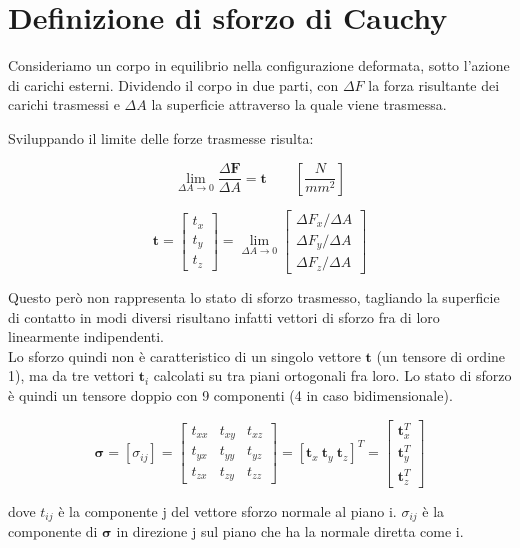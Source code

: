 \section{Definizione di sforzo di Cauchy}

Consideriamo un corpo in equilibrio nella configurazione deformata, sotto l'azione di carichi esterni. Dividendo il corpo in due parti, con $\Delta F$ la forza risultante dei carichi trasmessi e $\Delta A $ la superficie attraverso la quale viene trasmessa. 

Sviluppando il limite delle forze trasmesse risulta:

\begin{equation*}
 \lim_{\Delta A \to 0} \frac{\Delta \mathbf{F}}{\Delta A}   =\mathbf{t}             \quad\quad \left[ \frac{N}{mm^2} \right]
\end{equation*}

\begin{equation*}
\mathbf{t} = 
\begin{bmatrix}
t_x \\
t_y \\
t_z
\end{bmatrix}
=
\lim_{\Delta A \to 0} 
\begin{bmatrix}
\Delta F_x / \Delta A \\
\Delta F_y / \Delta A \\
\Delta F_z / \Delta A
\end{bmatrix}
\end{equation*}

Questo però non rappresenta lo stato di sforzo trasmesso, tagliando la superficie di contatto in modi diversi risultano infatti vettori di sforzo fra di loro linearmente indipendenti.\\
Lo sforzo quindi non è caratteristico di un singolo vettore $\mathbf{t}$ (un tensore di ordine 1),  ma da tre vettori $\mathbf{t}_i$ calcolati su tra piani ortogonali fra loro. Lo stato di sforzo è quindi un tensore doppio con 9 componenti (4 in caso bidimensionale).

\begin{equation*}
\boldsymbol{\sigma} 
= \left[ \sigma_{ij} \right] 
= \begin{bmatrix}
t_{xx} & t_{xy} & t_{xz} \\
t_{yx} & t_{yy} & t_{yz} \\
t_{zx} & t_{zy} & t_{zz}
\end{bmatrix}
= \left[ 
\mathbf{t}_x \ \mathbf{t}_y \ \mathbf{t}_z
\right]^T
=\begin{bmatrix}
\mathbf{t}_x^T \\
\mathbf{t}_y^T \\
\mathbf{t}_z^T
\end{bmatrix}
\end{equation*}

dove $t_{ij}$ è la componente j del vettore sforzo normale al piano i.
$\sigma_{ij}$ è la componente di $\boldsymbol{\sigma}$ in direzione j sul piano che ha la normale diretta come i.




